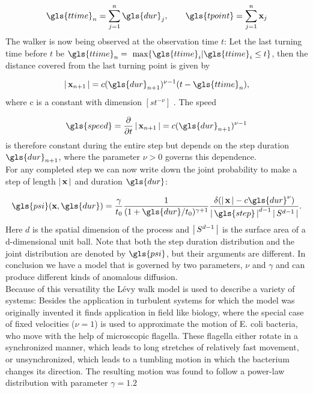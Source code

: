 \begin{align}
\gls{ttime}_n = \sum_{j=1}^n \gls{dur}_j , \qquad \gls{tpoint} = \sum_{j=1}^n \ve{x}_j
\end{align}
%
The walker is now being observed at the observation time $t$: Let the last turning time before $t$ be $\gls{ttime}_n = \text{ max} \{\gls{ttime}_i | \gls{ttime}_i \leq t \}$, then the distance covered from the last turning point is given by

\begin{align}
\abs{\ve{x}_{n+1}} = c (\gls{dur}_{n+1})^{\nu-1} (t-\gls{ttime}_n) ,
\end{align}
%
where c is a constant with dimension $ [ s t^{-\nu} ] $ . The speed 

\begin{align}
\gls{speed} = \pder{}{t} \abs{\ve{x}_{n+1}} = c (\gls{dur}_{n+1})^{\nu-1}
\end{align}
%
is therefore constant during the entire step but depends on the step duration $\gls{dur}_{n+1}$, where the parameter $\nu>0$ governs this dependence. \\
For any completed step we can now write down the joint probability to make a step of length $\left|\,\mathbf{ x }\,\right|$ and duration $\gls{dur}$:

\begin{align}
\gls{psi}(\ve{x}, \gls{dur} ) = \frac{\gamma}{t_0} \frac{1}{(1+\gls{dur}/t_0)^{\gamma+1}}  \frac{\delta(\abs{\ve{x}} - c \gls{dur}^{\nu}) }{\abs{\gls{step}}^{d-1} \abs{S^{d-1}}}  .
\end{align}
%
Here $d$ is the spatial dimension of the process and $\left|\,S^{d-1}\,\right|$ is the surface area of a d-dimensional unit ball. Note that both the step duration distribution and the joint distribution are denoted by $\gls{psi}$, but their arguments are different. In conclusion we have a model that is governed by two parameters, $\nu$ and $\gamma$ and can produce different kinds of anomalous diffusion.\\

Because of this versatility the L\'evy walk model is used to describe a variety of systems: Besides the application in turbulent systems for which the model was originally invented it finds application in field like biology, where  the special case of fixed velocities ($\nu=1$) is used to approximate the motion of E. coli bacteria, who move with the help of microscopic flagella. These flagella either rotate in a synchronized manner, which leads to long stretches of relatively fast movement, or unsynchronized, which leads to a tumbling motion in which the bacterium changes its direction. The resulting motion was found to follow a power-law distribution with parameter $\gamma = 1.2$ \cite{korobkova2004}

